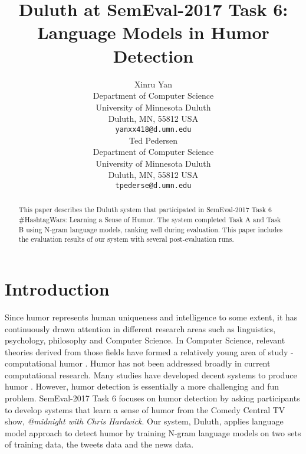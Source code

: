 \documentclass[11pt,a4paper]{article}
\title{Duluth at SemEval-2017 Task 6:  Language Models in Humor Detection}
\author{Xinru Yan \\
  Department of Computer Science \\ University of Minnesota Duluth \\ Duluth, MN, 55812 USA \\
  {\tt yanxx418@d.umn.edu} \\\And
  Ted Pedersen \\
  Department of Computer Science \\ University of Minnesota Duluth \\ Duluth, MN, 55812 USA \\
  {\tt tpederse@d.umn.edu} \\}
\date{}
\begin{document}
\maketitle
\begin{abstract}
  This paper describes the Duluth system that participated in SemEval-2017 Task 6 \#HashtagWars: Learning a Sense of Humor. The system completed Task A and Task B using N-gram language models, ranking well during evaluation. This paper includes the evaluation results of our system with several post-evaluation runs. 
\end{abstract}

\section{Introduction}
Since humor represents human uniqueness and intelligence to some extent, it has continuously drawn attention in different research areas such as linguistics, psychology, philosophy and Computer Science. In Computer Science, relevant theories derived from those fields have formed a relatively young area of study - computational humor \cite{Recognizing:Humor:On:Twitter}. Humor has not been addressed broadly in current computational research. Many studies have developed decent systems to produce humor \cite{ozbal2012computational}. However, humor detection is essentially a more challenging and fun problem. SemEval-2017 Task 6 focuses on humor detection by asking participants to develop systems that learn a sense of humor from the Comedy Central TV show, \textit{@midnight with Chris Hardwick}. Our system, Duluth, applies language model approach to detect humor by training N-gram language models on two sets of training data, the tweets data and the news data.\\
\end{document}
